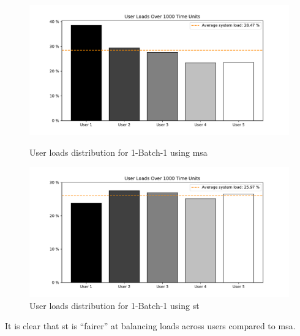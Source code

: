 \documentclass{seal_thesis}
\begin{document}
\begin{figure}[!ht]
	\centering
	\begin{minipage}[b]{0.45\textwidth}
		\includegraphics[width=\textwidth]{img/1_BATCHONE_MSA_NU5_GI3_SIM1000_FAIR}
		\caption{User loads distribution for 1-Batch-1 using \gls{msa}}
		\label{fig:msa_fairness}
	\end{minipage}
	\hfill
	\begin{minipage}[b]{0.45\textwidth}
		\includegraphics[width=\textwidth]{img/1_BATCHONE_ST_NU5_GI3_SIM1000_FAIR}
		\caption{User loads distribution for 1-Batch-1 using \gls{st}}
		\label{fig:st_fairness}
	\end{minipage}
\end{figure}

It is clear that \gls{st} is ``fairer'' at balancing loads across users compared to \gls{msa}. 

\subsection{}
\label{subsec:rl_discussion}
\end{document}
